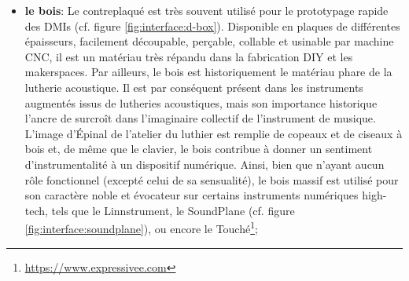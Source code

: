 \begin{itemize}[noitemsep]
	\item \textbf{le bois}: Le contreplaqué est très souvent utilisé pour le prototypage rapide des \glspl{DMI} (cf. figure \ref{fig:interface:d-box}). Disponible en plaques de différentes épaisseurs, facilement découpable, perçable, collable et usinable par machine \gls{CNC}, il est un matériau très répandu dans la fabrication \gls{DIY} et les \glspl{makerspace}. Par ailleurs, le bois est historiquement le matériau phare de la lutherie acoustique. Il est par conséquent présent dans les instruments augmentés issus de lutheries acoustiques, mais son importance historique l'ancre de surcroît dans l'imaginaire collectif de l'instrument de musique. L'image d'Épinal de l'atelier du luthier est remplie de copeaux et de ciseaux à bois et, de même que le clavier, le bois contribue à donner un sentiment d'instrumentalité à un dispositif numérique. Ainsi, bien que n'ayant aucun rôle fonctionnel (excepté celui de sa sensualité), le bois massif est utilisé pour son caractère noble et évocateur sur certains instruments numériques high-tech, tels que le Linnstrument, le SoundPlane (cf. figure \ref{fig:interface:soundplane}), ou encore le Touché\footnote{\url{https://www.expressivee.com}};
	\begin{figure}[!htbp]
\end{figure}
\end{itemize}
